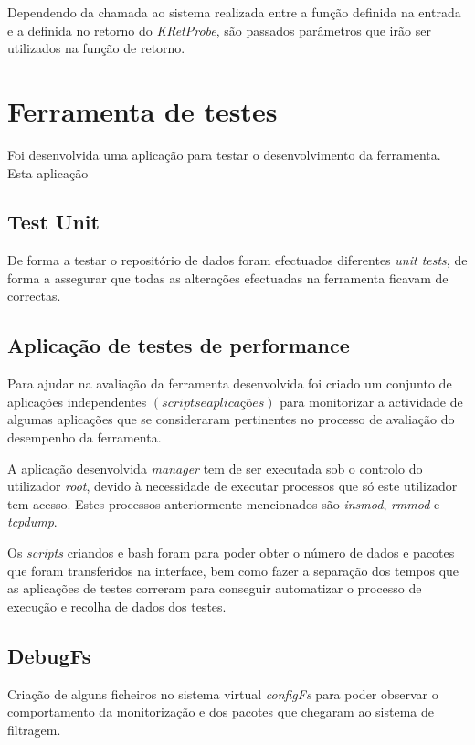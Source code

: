 Dependendo da chamada ao sistema realizada entre a função definida na entrada
e a definida no retorno do \textit{KRetProbe}, são passados parâmetros que irão
ser utilizados na função de retorno.


\section{Ferramenta de testes}

Foi desenvolvida uma aplicação para testar o desenvolvimento da ferramenta.
Esta aplicação 

\subsection{Test Unit}

De forma a testar o repositório de dados foram efectuados diferentes
\textit{unit tests}, de forma a assegurar que todas as alterações efectuadas na
ferramenta ficavam de correctas.

\subsection{Aplicação de testes de performance}

Para ajudar na avaliação da ferramenta desenvolvida foi criado um conjunto de
aplicações independentes $\left( scripts e aplicações \right)$ para monitorizar
a actividade de algumas aplicações que se consideraram pertinentes no processo
de avaliação do desempenho da ferramenta.

A aplicação desenvolvida \textit{manager} tem de ser executada sob o controlo
do utilizador \textit{root}, devido à necessidade de executar processos que só
este utilizador tem acesso. Estes processos anteriormente mencionados são
\textit{insmod}, \textit{rmmod} e \textit{tcpdump}.

Os \textit{scripts} criandos e bash foram para poder obter o número de dados e
pacotes que foram transferidos na interface, bem como fazer a separação dos
tempos que as aplicações de testes correram para conseguir automatizar o
processo de execução e recolha de dados dos testes.

\subsection{DebugFs}

Criação de alguns ficheiros no sistema virtual \textit{configFs} para poder
observar o comportamento da monitorização e dos pacotes que chegaram ao sistema
de filtragem.

